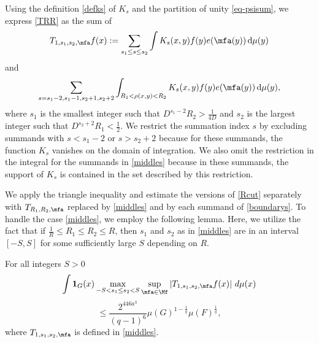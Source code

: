 Using the definition \eqref{defks} of $K_s$ and the partition of unity \eqref{eq-psisum}, we express \eqref{TRR} as the sum of
\begin{equation}\label{middles}
{T}_{1,s_1,s_2,\mfa}f(x):=\sum_{s_1 \le s\le s_2}
\int K_s(x,y) f(y) e(\mfa(y)) \, \mathrm{d}\mu(y)
\end{equation}
and
\begin{equation}\label{boundarys}
\sum_{s=s_1-2,s_1-1, s_2+1, s_2+2}
\int_{R_1 < \rho(x,y) < R_2} K_s(x,y) f(y) e(\mfa(y)) \,
 \mathrm{d}\mu(y),
\end{equation}
where $s_1$ is the smallest integer such that $D^{s_1-2}R_2>\frac 1{4D}$ and $s_2$ is the largest integer such that $D^{s_2+2}R_1<\frac 12$. We restrict the summation index $s$ by excluding summands with $s<s_1-2$ or $s>s_2+2$ because for these summands, the function $K_s$ vanishes on the domain of integration. We also omit the restriction in the integral for the summands in \eqref{middles} because in these summands, the support of $K_s$ is contained in the set described by this restriction.

We apply the triangle inequality and estimate the versions of \eqref{Rcut} separately with $T_{R_1,R_2,\mfa}$ replaced by \eqref{middles} and by each summand of \eqref{boundarys}. To handle the case \eqref{middles}, we employ the following lemma. Here, we utilize the fact that if $\frac 1R\le R_1\le R_2\le R$, then $s_1$ and $s_2$ as in \eqref{middles} are in an interval $[-S,S]$ for some sufficiently large $S$ depending on $R$.


\begin{lemma}[S truncation]
    \label{S-truncation}
    For all integers $S>0$
    $$
        \int \mathbf{1}_{G}(x)
        \max_{-S<s_1\le s_2<S}\sup_{\mfa\in\Mf}
        \left| T_{1, s_1,s_2,\mfa} f(x) \right|\, d\mu(x)
    $$
    \begin{equation} \label{Scut}
        \leq \frac{2^{446a^3}}{(q-1)^6} \mu(G)^{1 - \frac{1}{q}} \mu(F)^{\frac{1}{q}},
    \end{equation}
    where $T_{1, s_1,s_2,\mfa}$ is defined in \eqref{middles}.
\end{lemma}

